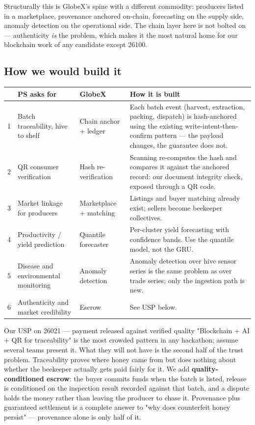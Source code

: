 \documentclass[11pt]{article}
\begin{document}
Structurally this is GlobeX's spine with a different commodity: producers listed in a marketplace,
provenance anchored on-chain, forecasting on the supply side, anomaly detection on the operational side.
The chain layer here is not bolted on --- authenticity \emph{is} the problem, which makes it the most
natural home for our blockchain work of any candidate except 26100.

\subsection*{How we would build it}
\renewcommand{\arraystretch}{1.35}
\noindent\begin{longtable}{@{}p{0.5cm}p{4.5cm}p{2.0cm}p{8.6cm}@{}}
\toprule
& \textbf{PS asks for} & \textbf{GlobeX} & \textbf{How it is built} \\
\midrule
\endhead
1 & Batch traceability, hive to shelf & Chain anchor + ledger & Each batch event (harvest, extraction, packing, dispatch) is hash-anchored using the existing write-intent-then-confirm pattern --- the payload changes, the guarantee does not. \\
2 & QR consumer verification & Hash re-verification & Scanning re-computes the hash and compares it against the anchored record: our document integrity check, exposed through a QR code. \\
3 & Market linkage for producers & Marketplace + matching & Listings and buyer matching already exist; sellers become beekeeper collectives. \\
4 & Productivity / yield prediction & Quantile forecaster & Per-cluster yield forecasting with confidence bands. Use the quantile model, not the GRU. \\
5 & Disease and environmental monitoring & Anomaly detection & Anomaly detection over hive sensor series is the same problem as over trade series; only the ingestion path is new. \\
6 & Authenticity and market credibility & Escrow & See USP below. \\
\bottomrule
\end{longtable}

\begin{uspbox}{Our USP on 26021 --- payment released against verified quality}
"Blockchain + AI + QR for traceability" is the most crowded pattern in any hackathon; assume several
teams present it. What they will not have is the second half of the trust problem. Traceability proves
where honey came from but does nothing about whether the beekeeper actually gets paid fairly for it. We
add \textbf{quality-conditioned escrow}: the buyer commits funds when the batch is listed, release is
conditioned on the inspection result recorded against that batch, and a dispute holds the money rather
than leaving the producer to chase it. Provenance plus guaranteed settlement is a complete answer to
"why does counterfeit honey persist" --- provenance alone is only half of it.
\end{uspbox}
\end{document}

